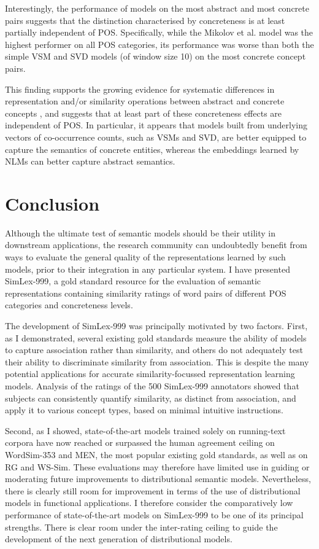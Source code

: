 Interestingly, the performance of models on the most abstract and most concrete pairs suggests that the distinction characterised by concreteness is at least partially independent of POS. Specifically, while the Mikolov et al. model was the highest performer on all POS categories, its performance was worse than both the simple VSM and SVD models (of window size 10) on the most concrete concept pairs.

This finding supports the growing evidence for systematic differences in representation and/or similarity operations between abstract and concrete concepts \cite{hill2013concreteness}, and suggests that at least part of these concreteness effects are independent of POS. In particular, it appears that models built from underlying vectors of co-occurrence counts, such as VSMs and SVD, are better equipped to capture the semantics of concrete entities, whereas the embeddings learned by NLMs can better capture abstract semantics. 

\section{Conclusion} 

Although the ultimate test of semantic models should be their utility in downstream applications, the research community can undoubtedly benefit from ways to evaluate the general quality of the representations learned by such models, prior to their integration in any particular system. I have presented SimLex-999, a gold standard resource for the evaluation of semantic representations containing similarity ratings of word pairs of different POS categories and concreteness levels. 

The development of SimLex-999 was principally motivated by two factors. First, as I demonstrated, several existing gold standards measure the ability of models to capture association rather than similarity, and others do not adequately test their ability to discriminate similarity from association. This is despite the many potential applications for accurate similarity-focussed representation learning models. Analysis of the ratings of the 500 SimLex-999 annotators showed that subjects can consistently quantify similarity, as distinct from association, and apply it to various concept types, based on minimal intuitive instructions. 

Second, as I showed, state-of-the-art models trained solely on running-text corpora have now reached or surpassed the human agreement ceiling on WordSim-353 and MEN, the most popular existing gold standards, as well as on RG and WS-Sim. These evaluations may therefore have limited use in guiding or moderating future improvements to distributional semantic models. Nevertheless, there is clearly still room for improvement in terms of the use of distributional models in functional applications. I therefore consider the comparatively low performance of state-of-the-art models on SimLex-999 to be one of its principal strengths. There is clear room under the inter-rating ceiling to guide the development of the next generation of distributional models. 

